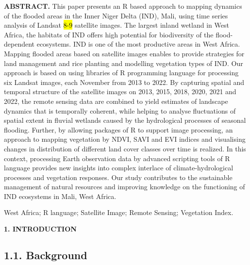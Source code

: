 \documentclass[12pt,a4paper,oneside]{article}
\def \newsection{\vspace{12pt}\textbf}
\def \newpar{\vspace{6pt}}
\begin{document}
{\bf ABSTRACT.} This paper presents an R based approach to mapping dynamics of the flooded areas in the Inner Niger Delta (IND), Mali, using time series analysis of Landsat \hl{8-9} satellite images. The largest inland wetland in West Africa, the habitats of IND offers high potential for biodiversity of the flood-dependent ecosystems. IND is one of the most productive areas in West Africa. Mapping flooded areas based on satellite images enables to provide strategies for land management and rice planting and modelling vegetation types of IND. Our approach is based on using libraries of R programming language for processing six Landsat images, each November from 2013 to 2022. By capturing spatial and temporal structure of the satellite images on 2013, 2015, 2018, 2020, 2021 and 2022, the remote sensing data are combined to yield estimates of landscape dynamics that is temporally coherent, while helping to analyse fluctuations of spatial extent in fluvial wetlands caused by the hydrological processes of seasonal flooding. Further, by allowing packages of R to support image processing, an approach to mapping vegetation by NDVI, SAVI and EVI indices and visualising changes in distribution of different land cover classes over time is realized. In this context, processing Earth observation data by advanced scripting tools of R language provides new insights into complex interlace of climate-hydrological processes and vegetation responses. Our study contributes to the sustainable management of natural resources and improving knowledge on the functioning of IND ecosystems in Mali, West Africa. 

\newpar {\bf Keywords:} West Africa; R language; Satellite Image; Remote Sensing; Vegetation Index.


\newsection {1. INTRODUCTION}

\subsection*{1.1. Background}
\end{document}
